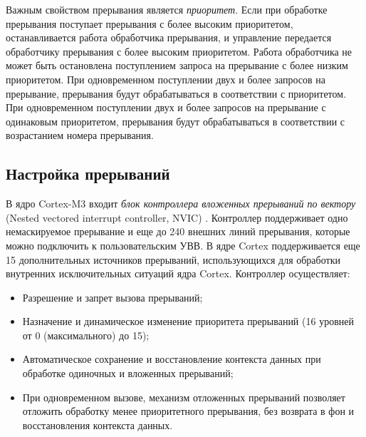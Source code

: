 Важным свойством прерывания является \textit{приоритет}. Если при обработке прерывания поступает прерывания с более высоким приоритетом, останавливается работа обработчика прерывания, и управление передается обработчику прерывания с более высоким приоритетом. Работа обработчика не может быть остановлена поступлением запроса на прерывание с более низким приоритетом. При одновременном поступлении двух и более запросов на прерывание, прерывания будут обрабатываться в соответствии с приоритетом. При одновременном поступлении двух и более запросов на прерывание с одинаковым приоритетом, прерывания будут обрабатываться в соответствии с возрастанием номера прерывания.
\subsection{Настройка прерываний}

В ядро Cortex-M3 входит \textit{блок контроллера вложенных прерываний по вектору} (Nested vectored interrupt controller, NVIC) \cite{arm} \cite{cortex}. Контроллер поддерживает одно немаскируемое прерывание и еще до 240 внешних линий прерывания, которые можно подключить к пользовательским УВВ. В ядре Cortex поддерживается еще 15 дополнительных источников прерываний, использующихся для обработки внутренних исключительных ситуаций ядра Cortex. Контроллер осуществляет:
\begin{itemize}
\item Разрешение и запрет вызова прерываний;
\item Назначение и динамическое изменение приоритета прерываний (16 уровней от 0 (максимального) до 15);
\item Автоматическое сохранение и восстановление контекста данных при обработке одиночных и вложенных прерываний;
\item При одновременном вызове, механизм отложенных прерываний позволяет отложить обработку менее приоритетного прерывания, без возврата в фон и восстановления контекста данных.
\end{itemize}

